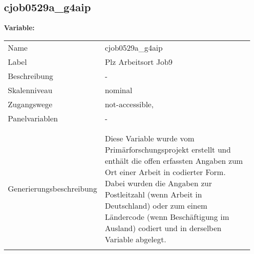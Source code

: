 	
	
	\subsection{cjob0529a\_g4aip}
	\label{subSection:cjob0529a_g4aip}

	\noindent\textbf{Variable:}\\
		\begin{tabular}{lL{11.3cm}}
			\label{tableVariable:cjob0529a_g4aip}
			Name & cjob0529a\_g4aip \\
			Label & Plz Arbeitsort Job9 \\
			Beschreibung & - \\
			Skalenniveau & nominal \\
			Zugangswege &
				not-accessible,
 \\
			Panelvariablen & -
			 \\
			 \\
 \\
					Generierungsbeschreibung & Diese Variable wurde vom Primärforschungsprojekt erstellt und enthält die offen erfassten Angaben zum Ort einer Arbeit in codierter Form. Dabei wurden die Angaben zur Postleitzahl (wenn Arbeit in Deutschland) oder zum einem Ländercode (wenn Beschäftigung im Ausland) codiert und in derselben Variable abgelegt.
				 \\	
			 \\
		\end{tabular}






	
	\newpage
